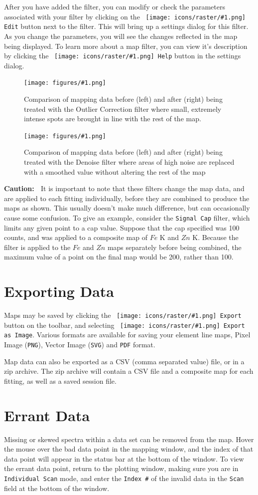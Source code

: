 \documentclass[article,twoside,11pt]{report}
\newcommand{\command}[1]{\texttt{#1}}
\newcommand{\icon}[1]{\texttt{[image: icons/raster/\#1.png]}}
\newcommand{\button}[2]{\ \command{\icon{#1} #2}}
\newcommand{\element}[1]{$#1$}
\newcommand{\caution}{{\bf \textcolor{BrickRed}{Caution: }\ }}
\newcommand{\screenshot}[2]{%
\begin{figure}[h!]
\centering\texttt{[image: figures/\#1.png]}
\caption{#2}
\end{figure}
}
\newcommand{\tocsection}[1]{\section*{#1}\addcontentsline{toc}{section}{#1}}
\begin{document}
After you have added the filter, you can modify or check the parameters associated with your filter by clicking on the \button{misc-preferences}{Edit} button next to the filter. This will bring up a settings dialog for this filter. As you change the parameters, you will see the changes reflected in the map being displayed. To learn more about a map filter, you can view it's description by clicking the \button{badge-help}{Help} button in the settings dialog.

\screenshot{map-filter-outliers}{Comparison of mapping data before (left) and after (right) being treated with the Outlier Correction filter where small, extremely intense spots are brought in line with the rest of the map.}

\screenshot{map-filter-denoise}{Comparison of mapping data before (left) and after (right) being treated with the Denoise filter where areas of high noise are replaced with a smoothed value without altering the rest of the map}

\caution It is important to note that these filters change the map data, and are applied to each fitting individually, before they are combined to produce the maps as shown. This usually doesn't make much difference, but can occasionally cause some confusion. To give an example, consider the \command{Signal Cap} filter, which limits any given point to a cap value. Suppose that the cap specified was 100 counts, and was applied to a composite map of \element{Fe} K and \element{Zn} K. Because the filter is applied to the \element{Fe} and \element{Zn} maps separately before being combined, the maximum value of a point on the final map would be 200, rather than 100.

\tocsection{Exporting Data}

Maps may be saved by clicking the \button{document-export}{Export} button on the toolbar, and selecting \button{mime-png}{Export as Image}. Various formats are available for saving your element line maps, Pixel Image (\command{PNG}), Vector Image (\command{SVG}) and \command{PDF} format.

Map data can also be exported as a CSV (comma separated value) file, or in a zip archive. The zip archive will contain a CSV file and a composite map for each fitting, as well as a saved session file.


\tocsection{Errant Data}

Missing or skewed spectra within a data set can be removed from the map. Hover the mouse over the bad data point in the mapping window, and the index of that data point will appear in the status bar at the bottom of the window. To view the errant data point, return to the plotting window, making sure you are in \command{Individual Scan} mode, and enter the \command{Index \#} of the invalid data in the \command{Scan} field at the bottom of the window. 
\end{document}
